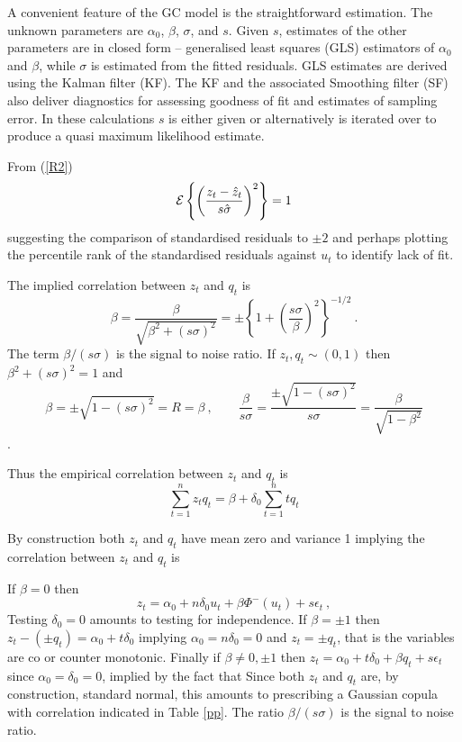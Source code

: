 \documentclass[authoryear]{elsarticle}
\newcommand{\eps}{\epsilon}
\newcommand{\Ex}{{\cal E}}
\newcommand{\eref}[1]{(\ref{#1})}
\newcommand{\tref}[1]{Table \ref{#1}}
\newcommand{\cq}{\ , \qquad}
\begin{document}
A convenient feature of the GC model is the straightforward estimation.   The unknown parameters are $\alpha_0$, $\beta$, $\sigma$, and $s$.  Given $s$, estimates of the other parameters are in closed form -- generalised least squares (GLS) estimators of $\alpha_0$ and $\beta$, while $\sigma$ is estimated from the fitted  residuals.   GLS estimates are derived using the Kalman filter (KF).   The KF  and the associated Smoothing filter (SF) also deliver diagnostics for assessing goodness of fit and estimates of  sampling error.  In these calculations $s$ is either given or alternatively is iterated over to produce a quasi maximum likelihood estimate.

From \eref{R2}
$$
\Ex\left\{ \left(\frac{z_{t}-\hat z_{t}}{s\hat\sigma}\right)^2\right\}=1
$$
suggesting  the comparison of standardised residuals  to $\pm 2$ and perhaps plotting the percentile rank of the standardised residuals against $u_t$ to identify  lack of fit.  

   The implied correlation between $z_t$ and $q_t$ is  
$$
\beta=\frac{\beta}{\sqrt{\beta^2+(s\sigma)^2}} = \pm\left\{1+\left(\frac{s\sigma}{\beta}\right)^2\right\}^{-1/2}\ .
$$
The term $\beta/(s\sigma)$ is the signal to noise ratio.  If $z_t, q_t\sim (0,1)$ then $\beta^2+(s\sigma)^2=1$ and  
$$
\beta=\pm\sqrt{1-(s\sigma)^2}=R=\beta \cq \frac{\beta}{s\sigma} = \frac{\pm\sqrt{1-(s\sigma)^2}}{s\sigma} = \frac{\beta}{\sqrt{1-\beta^2}} 
$$.


 Thus the empirical correlation between $z_t$ and $q_t$ is
$$
\sum_{t=1}^n z_tq_t = \beta+\delta_0\sum_{t=1}^n tq_t 
$$




By construction both $z_t$ and $q_t$ have mean zero and variance 1 implying
the correlation between $z_t$ and $q_t$ is


If  $\beta=0$ then 
$$
z_t=\alpha_0 + n\delta_0 u_t+\beta \Phi^-(u_t) +s\eps_t\ ,
$$
    Testing $\delta_0=0$ amounts to testing for independence.  If $\beta=\pm 1$ then 
$z_t-(\pm q_t)=\alpha_0+t\delta_0$ implying $\alpha_0=n\delta_0=0$ and  $z_t=\pm q_t$, that is the variables are co or counter monotonic.   Finally if $\beta\ne 0,\pm 1$ then $z_t=\alpha_0+t\delta_0+\beta q_t+s\eps_t$  since  $\alpha_0=\delta_0=0$, implied by the fact that    Since both $z_t$ and $q_t$ are, by construction, standard normal, this  amounts to prescribing  a Gaussian copula with correlation indicated in \tref{pp}.
The ratio $\beta/(s\sigma)$ is the  signal to noise ratio.
\end{document}
